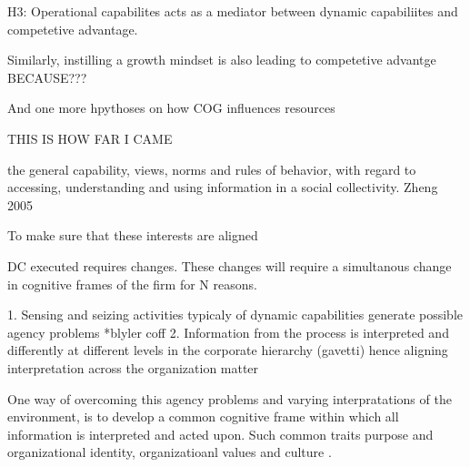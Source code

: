 H3: Operational capabilites acts as a mediator between dynamic capabiliites and
competetive advantage. 

Similarly, instilling a growth mindset is also leading to competetive advantge BECAUSE???


And one more hpythoses on how COG influences resources



THIS IS HOW FAR I CAME

the general capability, views, norms and rules of behavior, with regard to accessing,
understanding and using information in a social collectivity. Zheng 2005

To make sure that these interests are aligned



DC executed requires changes. These changes will require a simultanous change in cognitive
frames of the firm for N reasons.

1. Sensing and seizing activities typicaly of dynamic capabilities generate possible
agency problems *blyler coff
2. Information from the process is interpreted and differently at different levels in the
corporate hierarchy (gavetti) hence aligning interpretation across the organization matter

One way of overcoming this agency problems and varying interpratations of the environment,
is to develop a common cognitive frame within which all information is interpreted and
acted upon. Such common traits purpose and organizational identity, 
organizatioanl values and culture \citep{Verona2011}.



